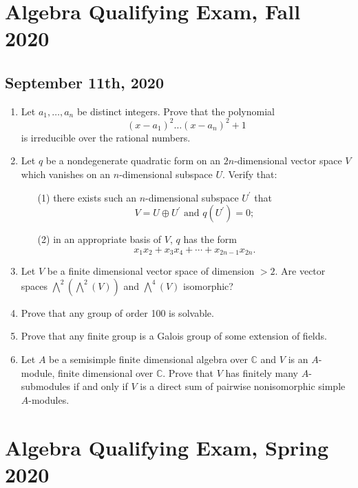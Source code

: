 \documentclass{article}
\begin{document}
\section*{Algebra Qualifying Exam, Fall 2020}
\subsection*{September 11th, 2020}

\begin{enumerate}
    \item Let \(a_{1},\ldots,a_{n}\) be distinct integers. Prove that the polynomial
    \[(x-a_{1})^{2}\ldots(x-a_{n})^{2}+1\]
    is irreducible over the rational numbers.

    \item Let \(q\) be a nondegenerate quadratic form on an \(2n\)-dimensional vector space \(V\) which vanishes on an \(n\)-dimensional subspace \(U\). Verify that:
    \begin{itemize}
        \item[(1)] there exists such an \(n\)-dimensional subspace \(U^{\prime}\) that \[V=U\oplus U^{\prime}\text{ and }q(U^{\prime})=0;\]
        \item[(2)] in an appropriate basis of \(V\), \(q\) has the form \[x_{1}x_{2}+x_{3}x_{4}+\cdots+x_{2n-1}x_{2n}.\]
    \end{itemize}

    \item Let \(V\) be a finite dimensional vector space of dimension \(>2\). Are vector spaces \(\bigwedge^{2}(\bigwedge^{2}(V))\) and \(\bigwedge^{4}(V)\) isomorphic?

    \item Prove that any group of order 100 is solvable.

    \item Prove that any finite group is a Galois group of some extension of fields.

    \item Let \(A\) be a semisimple finite dimensional algebra over \(\mathbb{C}\) and \(V\) is an \(A\)-module, finite dimensional over \(\mathbb{C}\). Prove that \(V\) has finitely many \(A\)-submodules if and only if \(V\) is a direct sum of pairwise nonisomorphic simple \(A\)-modules.
\end{enumerate}

\section*{Algebra Qualifying Exam, Spring 2020}
\end{document}

